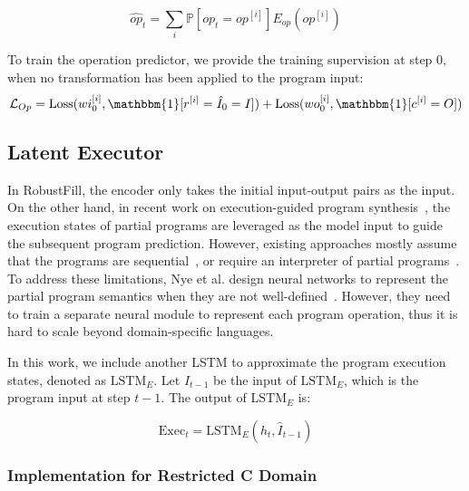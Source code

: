\[\hat{op}_t=\sum_{i}\mathbb{P}[op_t=op^{[i]}]E_{op}(op^{[i]})\]

 

To train the operation predictor, we provide the training supervision at step $0$, when no transformation has been applied to the program input:
\begin{equation}
\mathcal{L}_{Op}=\mathrm{Loss}(wi_0^{[i]}, \mathbbm{1}[r^{[i]}=\hat I_0=I]) + \mathrm{Loss}(wo_0^{[i]}, \mathbbm{1}[c^{[i]}=O]) \label{eq:loss-op}
\end{equation}

\subsection{Latent Executor}
\label{app:latent-executor}

In RobustFill, the encoder only takes the initial input-output pairs as the input. On the other hand, in recent work on execution-guided program synthesis~\cite{chen2018execution,sun2018neural,Zohar2018AutomaticPSExtendExecution,Ellis2019WriteEAExtendExecution,odena2020bustle,nye2020representing}, the execution states of partial programs are leveraged as the model input to guide the subsequent program prediction. However, existing approaches mostly assume that the programs are sequential~\cite{Zohar2018AutomaticPSExtendExecution,Ellis2019WriteEAExtendExecution}, or require an interpreter of partial programs~\cite{chen2018execution}. To address these limitations, Nye et al. design neural networks to represent the partial program semantics when they are not well-defined~\cite{nye2020representing}. However, they need to train a separate neural module to represent each program operation, thus it is hard to scale beyond domain-specific languages.

In this work, we include another LSTM to approximate the program execution states, denoted as $\mathrm{LSTM}_E$. Let $\hat I_{t-1}$ be the input of $\mathrm{LSTM}_E$, which is the program input at step $t-1$. The output of $\mathrm{LSTM}_E$ is:

\[\mathrm{Exec}_t=\mathrm{LSTM}_E(h_t, \hat I_{t-1})\]

\subsubsection{Implementation for Restricted C Domain}
\label{app:latent-executor-c}

